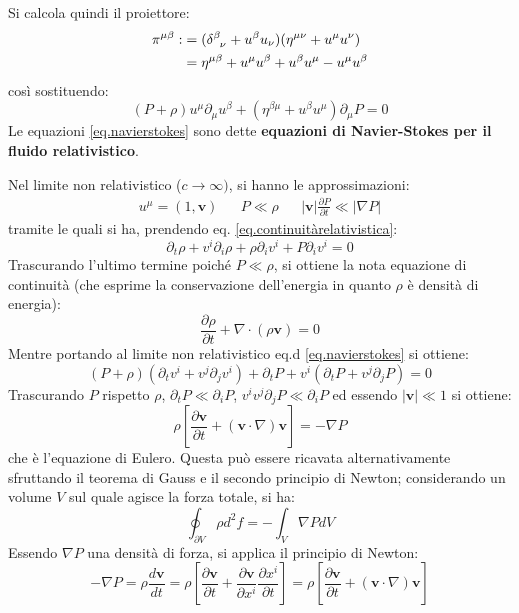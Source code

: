 Si calcola quindi il proiettore:
\begin{align*}
   \pi^{\mu\beta} :&= (\tensor{\delta}{^\beta_\nu} +u^\beta u_\nu)(\eta^{\mu\nu}+u^\mu u^\nu)\\
   &=\eta^{\mu\beta} + u^\mu u^\beta + u^\beta u^\mu -u^\mu u^\beta
\end{align*}
così sostituendo:
\begin{equation}
    (P+\rho)u^\mu \partial_\mu u^\beta + (\eta^{\beta\mu} +u^\beta u^\mu) \partial_\mu P = 0
    \label{eq.navierstokes}
\end{equation}
Le equazioni \ref{eq.navierstokes} sono dette \textbf{equazioni di Navier-Stokes per il fluido relativistico}. 

Nel limite non relativistico ($c\rightarrow\infty)$, si hanno le approssimazioni:
\begin{align*}
    u^\mu = (1, \bm{v}) && P \ll \rho && |\bm{v}|\frac{\partial P}{\partial t} \ll |\nabla P|
\end{align*}
tramite le quali si ha, prendendo eq. \ref{eq.continuitàrelativistica}:
\begin{equation*}
    \partial_t \rho + v^i\partial_i \rho +\rho\partial_i v^i +P\partial_i v^i = 0
\end{equation*}
Trascurando l'ultimo termine poiché $P\ll \rho$, si ottiene la nota equazione di continuità (che esprime la conservazione dell'energia in quanto $\rho$ è densità di energia):
\begin{equation*}
    \frac{\partial \rho}{\partial t} + \nabla \cdot (\rho\bm{v}) = 0
\end{equation*}
Mentre portando al limite non relativistico eq.d \ref{eq.navierstokes} si ottiene:
\begin{equation*}
    (P+\rho)(\partial_t v^i + v^j\partial_j v^i) + \partial_t P + v^i(\partial_t P + v^j \partial_j P )=0
\end{equation*}
Trascurando $P$ rispetto $\rho$, $\partial_t P \ll \partial_i P$, $v^iv^j\partial_j P \ll \partial_i P$ ed essendo $|\bm{v}| \ll 1$ si ottiene:
\begin{equation*}
    \rho\left[ \frac{\partial \bm{v}}{\partial t} + (\bm{v} \cdot\nabla)\bm{v} \right] = - \nabla P
\end{equation*}
che è l'equazione di Eulero. Questa può essere ricavata alternativamente sfruttando il teorema di Gauss e il secondo principio di Newton; considerando un volume $V$ sul quale agisce la forza totale, si ha:
\begin{equation*}
    \oint_{\partial V} \rho d^2f = -\int_{V} \nabla P dV
\end{equation*}
Essendo $\nabla P$ una densità di forza, si applica il principio di Newton:
\begin{equation*}
    - \nabla P = \rho \frac{d \bm{v}}{dt} = \rho \left[\frac{\partial \bm{v}}{\partial t} + \frac{\partial \bm{v}}{\partial x^i} \frac{\partial x^i}{\partial t}  \right] =  \rho\left[ \frac{\partial \bm{v}}{\partial t} + (\bm{v} \cdot\nabla)\bm{v} \right]
\end{equation*}

